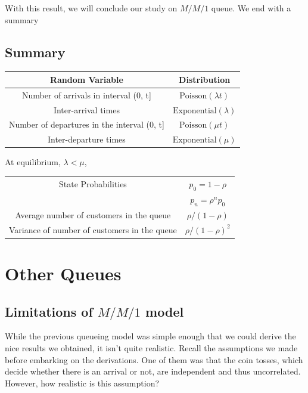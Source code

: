 \documentclass[11pt, a4paper]{report}
\begin{document}
With this result, we will conclude our study on $M/M/1$ queue. We end with a summary

\section{Summary}
\begin{center}    
    \begin{tabular}{|c|c|}
        \hline
        Random Variable & Distribution \\
        \hline
        \hline
        Number of arrivals in interval (0, t] & $\text{Poisson}(\lambda t)$ \\
        \hline
        Inter-arrival times & $\text{Exponential}(\lambda)$ \\
        \hline 
        Number of departures in the interval (0, t] & $\text{Poisson}(\mu t)$ \\
        \hline
        Inter-departure times & $\text{Exponential}(\mu)$ \\
        \hline
    \end{tabular}
\end{center}
At equilibrium, $\lambda < \mu$, 
\begin{center}
    \begin{tabular}{|c|c|}
        \hline 
        State Probabilities & $p_0 = 1 - \rho$ \\
        & $p_n = \rho^n p_0$ \\
        \hline
        Average number of customers in the queue & $\rho / (1 - \rho)$ \\
        \hline
        Variance of number of customers in the queue & $\rho / (1 - \rho)^2$ \\
        \hline
    \end{tabular}
\end{center}

\chapter{Other Queues}

\section{Limitations of $M/M/1$ model}
While the previous queueing model was simple enough that we could derive the nice results we obtained, it isn't quite realistic. Recall the assumptions we made before embarking on the derivations. One of them was that the coin tosses, which decide whether there is an arrival or not, are independent and thus uncorrelated. However, how realistic is this assumption?
\end{document}

